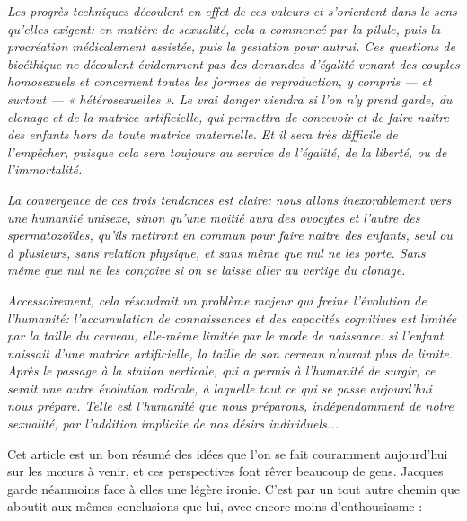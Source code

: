 \begin{displayquote}
\emph{\quarto Les progrès techniques découlent en effet de ces valeurs et s'orientent dans le sens qu'elles exigent: en matière de sexualité, cela a commencé par la pilule, puis la procréation médicalement assistée, puis la gestation pour autrui. Ces questions de bioéthique ne découlent évidemment pas des demandes d'égalité venant des couples homosexuels et concernent toutes les formes de reproduction, y compris --- et surtout --- « hétérosexuelles ». Le vrai danger viendra si l'on n'y prend garde, du clonage et de la matrice artificielle, qui permettra de concevoir et de faire naitre des enfants hors de toute matrice maternelle. Et il sera très difficile de l'empêcher, puisque cela sera toujours au service de l'égalité, de la liberté, ou de l'immortalité.}
 
\emph{ La convergence de ces trois tendances est claire: nous allons inexorablement vers une humanité unisexe, sinon qu'une moitié aura des ovocytes et l'autre des spermatozoïdes, qu'ils mettront en commun pour faire naitre des enfants, seul ou à plusieurs, sans relation physique, et sans même que nul ne les porte. Sans même que nul ne les conçoive si on se laisse aller au vertige du clonage.}
 
\emph{ Accessoirement, cela résoudrait un problème majeur qui freine l'évolution de l'humanité: l'accumulation de connaissances et des capacités cognitives est limitée par la taille du cerveau, elle-même limitée par le mode de naissance: si l'enfant naissait d'une matrice artificielle, la taille de son cerveau n'aurait plus de limite. Après le passage à la station verticale, qui a permis à l'humanité de surgir, ce serait une autre évolution radicale, à laquelle tout ce qui se passe aujourd'hui nous prépare. Telle est l'humanité que nous préparons, indépendamment de notre sexualité, par l'addition implicite de nos désirs individuels...}

\end{displayquote}


Cet article est un bon résumé des idées que l'on se fait couramment aujourd'hui sur les mœurs à venir, et ces perspectives font rêver beaucoup de gens. Jacques  garde néanmoins face à elles une légère ironie. C'est par un tout autre chemin que  aboutit aux mêmes conclusions que lui, avec encore moins d'enthousiasme  :

